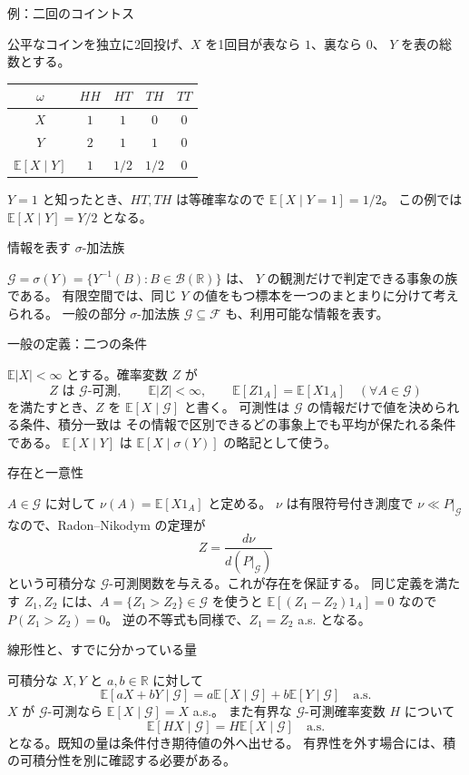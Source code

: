 \documentclass[a4paper,10pt,pdflatex,ja=standard,jafont=ipaex-type1,
  magstyle=real,scale=1]{bxjsarticle}
\newcommand{\topic}[1]{\par\vspace{5pt}
  {\large\sffamily\mdseries\color{accent}#1}\par\vspace{2pt}}
\newcommand{\F}{\mathcal F}
\newcommand{\R}{\mathbb R}
\newcommand{\E}{\mathbb E}
\newcommand{\ind}{\mathrm{1}}
\begin{document}
\topic{例：二回のコイントス}
公平なコインを独立に2回投げ、$X$ を1回目が表なら $1$、裏なら $0$、
$Y$ を表の総数とする。
\begin{center}
\renewcommand{\arraystretch}{1.25}
\begin{tabular}{@{}ccccc@{}}
\toprule
$\omega$ & $HH$ & $HT$ & $TH$ & $TT$ \\
\midrule
$X$ & $1$ & $1$ & $0$ & $0$ \\
$Y$ & $2$ & $1$ & $1$ & $0$ \\
$\E[X\mid Y]$ & $1$ & $1/2$ & $1/2$ & $0$ \\
\bottomrule
\end{tabular}
\end{center}
$Y=1$ と知ったとき、$HT,TH$ は等確率なので $\E[X\mid Y=1]=1/2$。
この例では $\E[X\mid Y]=Y/2$ となる。

\topic{情報を表す $\sigma$-加法族}
$\mathcal G=\sigma(Y)=\{Y^{-1}(B):B\in\mathcal B(\R)\}$ は、
$Y$ の観測だけで判定できる事象の族である。
有限空間では、同じ $Y$ の値をもつ標本を一つのまとまりに分けて考えられる。
一般の部分 $\sigma$-加法族 $\mathcal G\subseteq\F$ も、利用可能な情報を表す。

\topic{一般の定義：二つの条件}
$\E|X|<\infty$ とする。確率変数 $Z$ が
$$Z\text{ は }\mathcal G\text{-可測},\qquad \E|Z|<\infty,\qquad
 \E[Z\ind_A]=\E[X\ind_A]\quad(\forall A\in\mathcal G)$$
を満たすとき、$Z$ を $\E[X\mid\mathcal G]$ と書く。
可測性は $\mathcal G$ の情報だけで値を決められる条件、積分一致は
その情報で区別できるどの事象上でも平均が保たれる条件である。
$\E[X\mid Y]$ は $\E[X\mid\sigma(Y)]$ の略記として使う。

\newpage
\topic{存在と一意性}
$A\in\mathcal G$ に対して $\nu(A)=\E[X\ind_A]$ と定める。
$\nu$ は有限符号付き測度で $\nu\ll P|_{\mathcal G}$ なので、Radon--Nikodym の定理が
$$Z=\frac{d\nu}{d(P|_{\mathcal G})}$$
という可積分な $\mathcal G$-可測関数を与える。これが存在を保証する。
同じ定義を満たす $Z_1,Z_2$ には、$A=\{Z_1>Z_2\}\in\mathcal G$ を使うと
$\E[(Z_1-Z_2)\ind_A]=0$ なので $P(Z_1>Z_2)=0$。
逆の不等式も同様で、$Z_1=Z_2$ a.s. となる。

\topic{線形性と、すでに分かっている量}
可積分な $X,Y$ と $a,b\in\R$ に対して
$$\E[aX+bY\mid\mathcal G]
 =a\E[X\mid\mathcal G]+b\E[Y\mid\mathcal G]\quad\text{a.s.}$$
$X$ が $\mathcal G$-可測なら $\E[X\mid\mathcal G]=X$ a.s.。
また有界な $\mathcal G$-可測確率変数 $H$ について
$$\E[HX\mid\mathcal G]=H\E[X\mid\mathcal G]\quad\text{a.s.}$$
となる。既知の量は条件付き期待値の外へ出せる。
有界性を外す場合には、積の可積分性を別に確認する必要がある。
\end{document}
